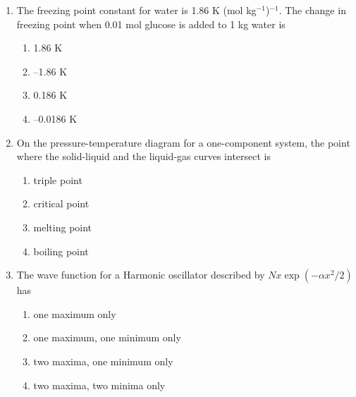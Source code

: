 \documentclass[journal,12pt,onecolumn]{IEEEtran}
\theoremstyle{remark}
\begin{document}
\begin{enumerate}
\begin{multicols}{2}
\begin{enumerate}
    \item 0.1386 min$^{-1}$
    \item 0.0693 min$^{-1}$
    \item 0.1386 mol L$^{-1}$ min$^{-1}$
    \item 0.0693 mol L$^{-1}$ min$^{-1}$
\end{enumerate}
\end{multicols}
 

\item    \hspace{0.5cm} The freezing point constant for water is 1.86 K (mol kg$^{-1}$)$^{-1}$. The change in freezing point when 0.01 mol glucose is added to 1 kg water is  \hfill{}

\begin{multicols}{2}
\begin{enumerate}
    \item 1.86 K
    \item --1.86 K
    \item 0.186 K
    \item --0.0186 K
\end{enumerate}
\end{multicols}
 

\item    \hspace{0.5cm} On the pressure-temperature diagram for a one-component system, the point where the solid-liquid and the liquid-gas curves intersect is  \hfill{}

\begin{multicols}{2}
\begin{enumerate}
    \item triple point
    \item critical point
    \item melting point
    \item boiling point
\end{enumerate}
\end{multicols}

 
\item    \hspace{0.5cm} The wave function for a Harmonic oscillator described by $Nx \exp(-\alpha x^2 / 2)$ has  \hfill{}

\begin{multicols}{2}
\begin{enumerate}
    \item one maximum only
    \item one maximum, one minimum only
    \item two maxima, one minimum only
    \item two maxima, two minima only
\end{enumerate}
\end{multicols}
 



\end{enumerate}
\end{document}
